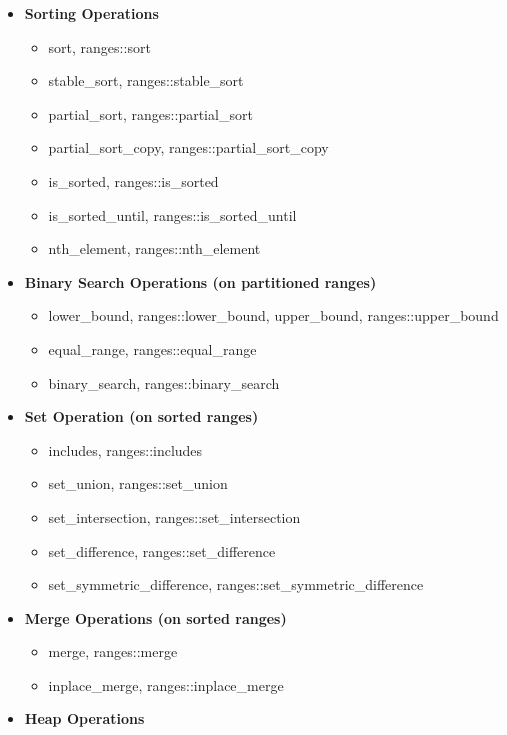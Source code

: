 \documentclass{article}
\begin{document}
\begin{itemize}
        \item \textbf{Sorting Operations}
          \begin{itemize}
            \item sort, ranges::sort
            \item stable\_sort, ranges::stable\_sort
            \item partial\_sort, ranges::partial\_sort
            \item partial\_sort\_copy, ranges::partial\_sort\_copy
            \item is\_sorted, ranges::is\_sorted
            \item is\_sorted\_until, ranges::is\_sorted\_until
            \item nth\_element, ranges::nth\_element
          \end{itemize}
        \item \textbf{Binary Search Operations (on partitioned ranges)}
          \begin{itemize}
            \item lower\_bound, ranges::lower\_bound, upper\_bound, ranges::upper\_bound
            \item equal\_range, ranges::equal\_range
            \item binary\_search, ranges::binary\_search
          \end{itemize}
        \item \textbf{Set Operation (on sorted ranges)}
          \begin{itemize}
            \item includes, ranges::includes
            \item set\_union, ranges::set\_union
            \item set\_intersection, ranges::set\_intersection
            \item set\_difference, ranges::set\_difference
            \item set\_symmetric\_difference, ranges::set\_symmetric\_difference
          \end{itemize}
        \item \textbf{Merge Operations (on sorted ranges)}
          \begin{itemize}
            \item merge, ranges::merge
            \item inplace\_merge, ranges::inplace\_merge
          \end{itemize}
        \item \textbf{Heap Operations}

\end{itemize}
\end{document}
